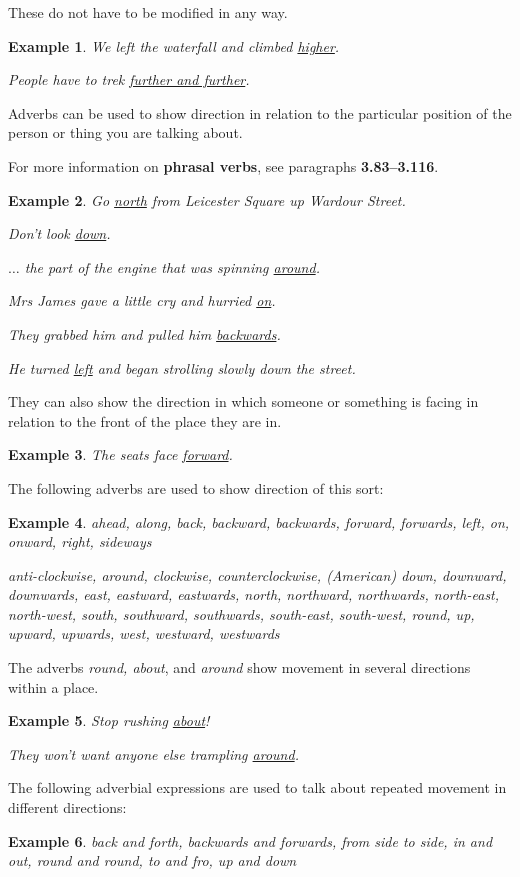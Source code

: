 \documentclass[oneside]{book}
\numberwithin{equation}{section}
\newtheorem{example}{Example}[section]
\begin{document}
These do not have to be modified in any way.
\begin{example}
    We left the waterfall and climbed \underline{higher}.
    
    People have to trek \underline{further and further}.
\end{example}
%
\noindent{} Adverbs can be used to show direction in relation to the particular position of the person or thing you are talking about.

For more information on \textbf{phrasal verbs}, see paragraphs \textbf{3.83--3.116}.
\begin{example}
    Go \underline{north} from Leicester Square up Wardour Street.
    
    Don't look \underline{down}.
    
    $\ldots$  the part of the engine that was spinning \underline{around}.
    
    Mrs James gave a little cry and hurried \underline{on}.
    
    They grabbed him and pulled him \underline{backwards}.
    
    He turned \underline{left} and began strolling slowly down the street.
\end{example}
They can also show the direction in which someone or something is facing in relation to the front of the place they are in.
\begin{example}
    The seats face \underline{forward}.
\end{example}
The following adverbs are used to show direction of this sort:
\begin{example}
    ahead, along, back, backward, backwards, forward, forwards, left, on, onward, right, sideways
    
    anti-clockwise, around, clockwise, counterclockwise, \emph{(American)} down, downward, downwards, east, eastward, eastwards, north, northward, northwards, north-east, north-west, south, southward, southwards, south-east, south-west, round, up, upward, upwards, west, westward, westwards
\end{example}
%
\noindent{} The adverbs \textit{round, about}, and \textit{around} show movement in several directions within a place.
\begin{example}
    Stop rushing \underline{about}!
    
    They won't want anyone else trampling \underline{around}.
\end{example}
The following adverbial expressions are used to talk about repeated movement in different directions:
\begin{example}
    back and forth, backwards and forwards, from side to side, in and out, round and round, to and fro, up and down
\end{example}
\end{document}
